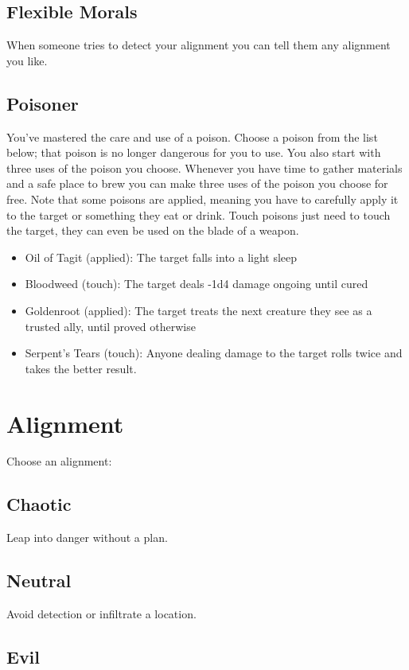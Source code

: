 \subsection{Flexible Morals}


 When someone tries to detect your alignment you can tell them any alignment you like.
\subsection{Poisoner}


 You've mastered the care and use of a poison. Choose a poison from the list below; that poison is no longer dangerous for you to use. You also start with three uses of the poison you choose. Whenever you have time to gather materials and a safe place to brew you can make three uses of the poison you choose for free. Note that some poisons are applied, meaning you have to carefully apply it to the target or something they eat or drink. Touch poisons just need to touch the target, they can even be used on the blade of a weapon.
\begin{itemize}
\item Oil of Tagit (applied): The target falls into a light sleep
\item Bloodweed (touch): The target deals -1d4 damage ongoing until cured
\item Goldenroot (applied): The target treats the next creature they see as a trusted ally, until proved otherwise
\item Serpent's Tears (touch): Anyone dealing damage to the target rolls twice and takes the better result.

\end{itemize}
\section{Alignment}


 Choose an alignment:
\subsection{Chaotic}


 Leap into danger without a plan.
\subsection{Neutral}


 Avoid detection or infiltrate a location.
\subsection{Evil}


